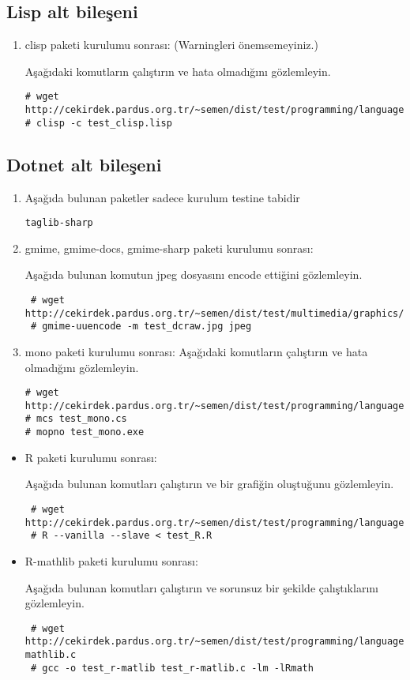 \documentclass[a4paper,10pt]{article}
\begin{document}
\subsection{Lisp alt bileşeni}
\begin{enumerate}
 \item clisp paketi kurulumu sonrası: (Warningleri önemsemeyiniz.)

Aşağıdaki komutların çalıştırın ve hata olmadığını gözlemleyin.
\begin{verbatim}
# wget http://cekirdek.pardus.org.tr/~semen/dist/test/programming/language/lisp/test_clisp.lisp 
# clisp -c test_clisp.lisp
\end{verbatim}

\end{enumerate}
\subsection{Dotnet alt bileşeni}
\begin{enumerate}

\item Aşağıda bulunan paketler sadece kurulum testine tabidir
\begin{verbatim}
taglib-sharp 
\end{verbatim}

 \item gmime, gmime-docs, gmime-sharp paketi kurulumu sonrası:

Aşağıda bulunan komutun jpeg dosyasını encode ettiğini gözlemleyin.
\begin{verbatim}
 # wget http://cekirdek.pardus.org.tr/~semen/dist/test/multimedia/graphics/test_dcraw.jpg
 # gmime-uuencode -m test_dcraw.jpg jpeg
\end{verbatim}


 \item mono paketi kurulumu sonrası:
Aşağıdaki komutların çalıştırın ve hata olmadığını gözlemleyin.
\begin{verbatim}
# wget http://cekirdek.pardus.org.tr/~semen/dist/test/programming/language/dotnet/test_mono.cs
# mcs test_mono.cs
# mopno test_mono.exe
\end{verbatim}
\end{enumerate}


\begin{itemize}
 \item R paketi kurulumu sonrası:

Aşağıda bulunan komutları çalıştırın ve bir grafiğin oluştuğunu gözlemleyin.
\begin{verbatim}
 # wget http://cekirdek.pardus.org.tr/~semen/dist/test/programming/language/test_R.R
 # R --vanilla --slave < test_R.R
\end{verbatim}
\item R-mathlib paketi kurulumu sonrası:

Aşağıda bulunan komutları çalıştırın ve sorunsuz bir şekilde çalıştıklarını gözlemleyin.	
\begin{verbatim}
 # wget http://cekirdek.pardus.org.tr/~semen/dist/test/programming/language/test_r-mathlib.c
 # gcc -o test_r-matlib test_r-matlib.c -lm -lRmath
\end{verbatim}
\end{itemize}
\end{document}
